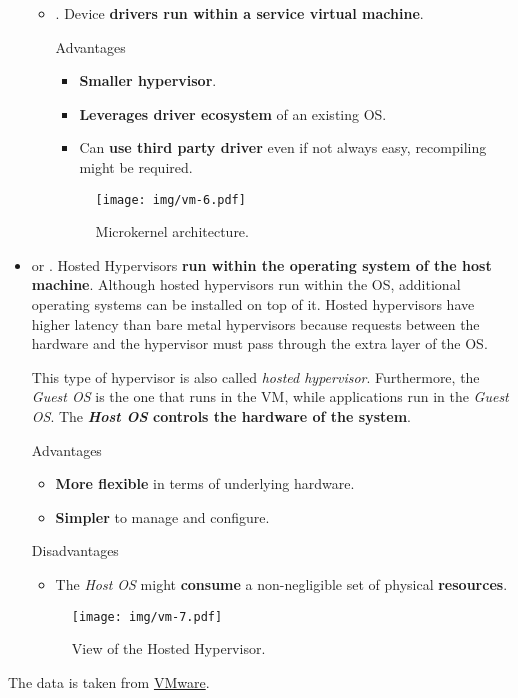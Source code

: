 \begin{itemize}
\begin{itemize}
		\item {}. Device \textbf{drivers run within a service virtual machine}.
		\begin{flushleft}
			\textcolor{Green3}{ Advantages}
		\end{flushleft}
		\begin{itemize}
			\item \textbf{Smaller hypervisor}.
			\item \textbf{Leverages driver ecosystem} of an existing OS.
			\item Can \textbf{use third party driver} even if not always easy, recompiling might be required.
		\end{itemize}
		\newpage
		\begin{figure}[!htp]
			\centering
			\texttt{[image: img/vm-6.pdf]}
			\caption{Microkernel architecture.}
		\end{figure}
	\end{itemize}


	\item {} or . Hosted Hypervisors \textbf{run within the operating system of the host machine}. Although hosted hypervisors run within the OS, additional operating systems can be installed on top of it. Hosted hypervisors have higher latency than bare metal hypervisors because requests between the hardware and the hypervisor must pass through the extra layer of the OS.
	
	This type of hypervisor is also called \emph{hosted hypervisor}. Furthermore, the \emph{Guest OS} is the one that runs in the VM, while applications run in the \emph{Guest OS}. The \textbf{\emph{Host OS} controls the hardware of the system}.
	\begin{flushleft}
		\textcolor{Green3}{ Advantages}
	\end{flushleft}
	\begin{itemize}
		\item \textbf{More flexible} in terms of underlying hardware.
		\item \textbf{Simpler} to manage and configure.
	\end{itemize}
	\begin{flushleft}
		\textcolor{Red2}{ Disadvantages}
	\end{flushleft}
	\begin{itemize}
		\item The \emph{Host OS} might \textbf{consume} a non-negligible set of physical \textbf{resources}.
	\end{itemize}
	\begin{figure}[!htp]
		\centering
		\texttt{[image: img/vm-7.pdf]}
		\caption{View of the Hosted Hypervisor.}
	\end{figure}
\end{itemize}
The data is taken from \href{https://www.vmware.com/topics/bare-metal-hypervisor}{VMware}.

